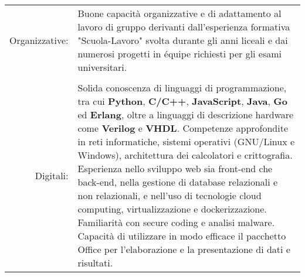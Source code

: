 \documentclass[a4paper,11pt]{article} %
\begin{document}
\begin{tabular}{rl}
\multicolumn{1}{p{2.5cm}}{Organizzative:} & \multicolumn{1}{p{11.5cm}}{Buone capacità organizzative e di adattamento al lavoro di gruppo derivanti dall'esperienza formativa "Scuola-Lavoro" svolta durante gli anni liceali e dai numerosi progetti in équipe richiesti per gli esami universitari.}\\
\\

\multicolumn{1}{p{2.5cm}}{Digitali:} & \multicolumn{1}{p{11.5cm}}{Solida conoscenza di linguaggi di programmazione, tra cui \textbf{Python}, \textbf{C/C++}, \textbf{JavaScript}, \textbf{Java}, \textbf{Go} ed \textbf{Erlang}, oltre a linguaggi di descrizione hardware come \textbf{Verilog} e \textbf{VHDL}. Competenze approfondite in reti informatiche, sistemi operativi (GNU/Linux e Windows), architettura dei calcolatori e crittografia. Esperienza nello sviluppo web sia front-end che back-end, nella gestione di database relazionali e non relazionali, e nell’uso di tecnologie cloud computing, virtualizzazione e dockerizzazione. Familiarità con secure coding e analisi malware. Capacità di utilizzare in modo efficace il pacchetto Office per l’elaborazione e la presentazione di dati e risultati.}\\
\end{tabular}


%


\end{document}
